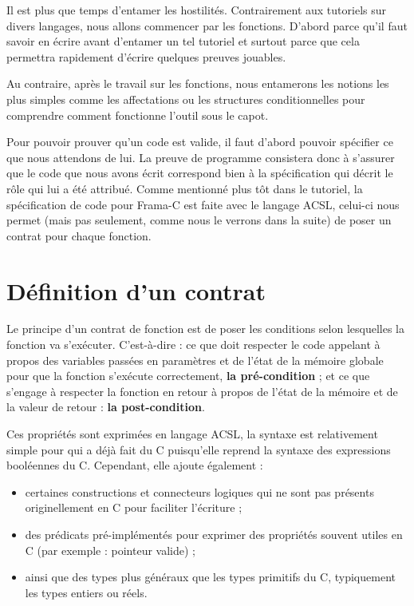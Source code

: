 \documentclass[12pt,francais,]{scrbook}
\providecommand{\tightlist}{%
  \setlength{\itemsep}{0pt}\setlength{\parskip}{0pt}}
\begin{document}
Il est plus que temps d'entamer les hostilités. Contrairement aux
tutoriels sur divers langages, nous allons commencer par les fonctions.
D'abord parce qu'il faut savoir en écrire avant d'entamer un tel
tutoriel et surtout parce que cela permettra rapidement d'écrire
quelques preuves jouables.

Au contraire, après le travail sur les fonctions, nous entamerons les
notions les plus simples comme les affectations ou les structures
conditionnelles pour comprendre comment fonctionne l'outil sous le
capot.

Pour pouvoir prouver qu'un code est valide, il faut d'abord pouvoir
spécifier ce que nous attendons de lui. La preuve de programme
consistera donc à s'assurer que le code que nous avons écrit correspond
bien à la spécification qui décrit le rôle qui lui a été attribué. Comme
mentionné plus tôt dans le tutoriel, la spécification de code pour
Frama-C est faite avec le langage ACSL, celui-ci nous permet (mais pas
seulement, comme nous le verrons dans la suite) de poser un contrat pour
chaque fonction.

\section{Définition d'un contrat}\label{duxe9finition-dun-contrat}

Le principe d'un contrat de fonction est de poser les conditions selon
lesquelles la fonction va s'exécuter. C'est-à-dire : ce que doit
respecter le code appelant à propos des variables passées en paramètres
et de l'état de la mémoire globale pour que la fonction s'exécute
correctement, \textbf{la pré-condition} ; et ce que s'engage à respecter
la fonction en retour à propos de l'état de la mémoire et de la valeur
de retour : \textbf{la post-condition}.

Ces propriétés sont exprimées en langage ACSL, la syntaxe est
relativement simple pour qui a déjà fait du C puisqu'elle reprend la
syntaxe des expressions booléennes du C. Cependant, elle ajoute
également :

\begin{itemize}
\tightlist
\item
  certaines constructions et connecteurs logiques qui ne sont pas
  présents originellement en C pour faciliter l'écriture ;
\item
  des prédicats pré-implémentés pour exprimer des propriétés souvent
  utiles en C (par exemple : pointeur valide) ;
\item
  ainsi que des types plus généraux que les types primitifs du C,
  typiquement les types entiers ou réels.
\end{itemize}
\end{document}
